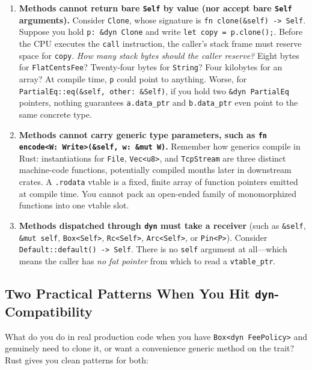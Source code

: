 \begin{enumerate}
  \item \textbf{Methods cannot return bare \texttt{Self} by value (nor accept bare \texttt{Self} arguments).}
  Consider \texttt{Clone}, whose signature is \texttt{fn clone(\&self) -> Self}. Suppose you hold \texttt{p: \&dyn Clone} and write \texttt{let copy = p.clone();}. Before the CPU executes the \texttt{call} instruction, the caller's stack frame must reserve space for \texttt{copy}. \emph{How many stack bytes should the caller reserve?} Eight bytes for \texttt{FlatCentsFee}? Twenty-four bytes for \texttt{String}? Four kilobytes for an array? At compile time, \texttt{p} could point to anything. Worse, for \texttt{PartialEq::eq(\&self, other: \&Self)}, if you hold two \texttt{\&dyn PartialEq} pointers, nothing guarantees \texttt{a.data\_ptr} and \texttt{b.data\_ptr} even point to the same concrete type.
  \item \textbf{Methods cannot carry generic type parameters, such as \texttt{fn encode<W: Write>(\&self, w: \&mut W)}.}
  Remember how generics compile in Rust: instantiations for \texttt{File}, \texttt{Vec<u8>}, and \texttt{TcpStream} are three distinct machine-code functions, potentially compiled months later in downstream crates. A \texttt{.rodata} vtable is a fixed, finite array of function pointers emitted at compile time. You cannot pack an open-ended family of monomorphized functions into one vtable slot.
  \item \textbf{Methods dispatched through \texttt{dyn} must take a receiver} (such as \texttt{\&self}, \texttt{\&mut self}, \texttt{Box<Self>}, \texttt{Rc<Self>}, \texttt{Arc<Self>}, or \texttt{Pin<P>}).
  Consider \texttt{Default::default() -> Self}. There is no \texttt{self} argument at all---which means the caller has \emph{no fat pointer} from which to read a \texttt{vtable\_ptr}.
\end{enumerate}

\subsection{Two Practical Patterns When You Hit \texttt{dyn}-Compatibility}

What do you do in real production code when you have \texttt{Box<dyn FeePolicy>} and genuinely need to clone it, or want a convenience generic method on the trait? Rust gives you clean patterns for both:

